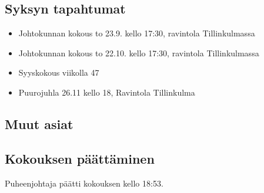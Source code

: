 \documentclass[a4paper,12pt]{article}
\begin{document}
\subsection{Syksyn tapahtumat}
\begin{itemize}
\item{Johtokunnan kokous} to 23.9. kello 17:30, ravintola Tillinkulmassa
\item{Johtokunnan kokous} to 22.10. kello 17:30, ravintola Tillinkulmassa
\item{Syyskokous} viikolla 47
\item{Puurojuhla} 26.11 kello 18, Ravintola Tillinkulma
\end{itemize}
\subsection{Muut asiat}
\subsection{Kokouksen päättäminen}
Puheenjohtaja päätti kokouksen kello 18:53.
\end{document}
